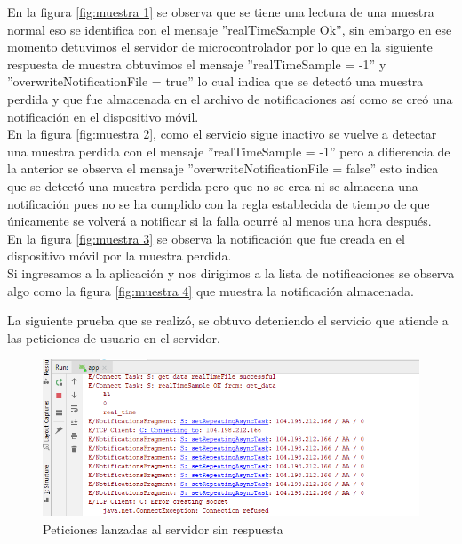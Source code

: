 En la figura \ref{fig:muestra 1} se observa que se tiene una lectura de una muestra normal eso se identifica con el mensaje ''realTimeSample Ok'', sin embargo en ese momento detuvimos el servidor de microcontrolador por lo que en la siguiente respuesta de muestra obtuvimos el mensaje ''realTimeSample = -1'' y ''overwriteNotificationFile = true'' lo cual indica que se detectó una muestra perdida y que fue almacenada en el archivo de notificaciones así como se creó una notificación en el dispositivo móvil. 
\\ \newline
En la figura \ref{fig:muestra 2}, como el servicio sigue inactivo se vuelve a detectar una muestra perdida con el mensaje ''realTimeSample = -1'' pero a difierencia de la anterior se observa el mensaje ''overwriteNotificationFile = false'' esto indica que se detectó una muestra perdida pero que no se crea ni se almacena una notificación pues no se ha cumplido con la regla establecida de tiempo de que únicamente se volverá a notificar si la falla ocurré al menos una hora después.
\\ \newline
En la figura \ref{fig:muestra 3} se observa la notificación que fue creada en el dispositivo móvil por la muestra perdida.
\\ \newline
Si ingresamos a la aplicación y nos dirigimos a la lista de notificaciones se observa algo como la figura \ref{fig:muestra 4} que muestra la notificación almacenada. 
\\ \newline

La siguiente prueba que se realizó, se obtuvo deteniendo el servicio que atiende a las peticiones de usuario en el servidor. 

\begin{figure}[H]
	\centering
	\includegraphics[scale=.7]{Capitulo5/images/muestra5.png}
	\caption{Peticiones lanzadas al servidor sin respuesta}	
	\label{fig:muestra 5}
\end{figure} 

